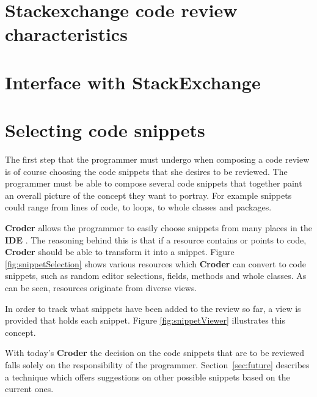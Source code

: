 \documentclass{sigchi}
\newcommand{\croder}{\textbf{Croder }}
\newcommand{\IDE}{\textbf{IDE }}
\begin{document}
\section{Stackexchange code review characteristics}
\section{Interface with StackExchange}

\section{Selecting code snippets}

 The first step that the programmer must undergo when composing a code review is of course choosing the code snippets that she desires to be reviewed. The programmer must be able to compose several code snippets that together paint an overall picture of the concept they want to portray. For example snippets could range from lines of code, to loops, to whole classes and packages.

 \croder allows the programmer to easily choose snippets from many places in the \IDE. The reasoning behind this is that if a resource contains or points to code, \croder should be able to transform it into a snippet. Figure \ref{fig:snippetSelection} shows  various resources which \croder can convert to code snippets, such as random editor selections, fields, methods and whole classes. As can be seen, resources originate from diverse views.

 In order to track what snippets have been added to the review so far, a view is provided that holds each snippet. Figure \ref{fig:snippetViewer} illustrates this concept.
 
 With today's \croder the decision on the code snippets that are to be reviewed falls solely on the responsibility of the programmer. Section~\ref{sec:future} describes a technique which offers suggestions on other possible snippets based on the current ones.
 
\end{document}
